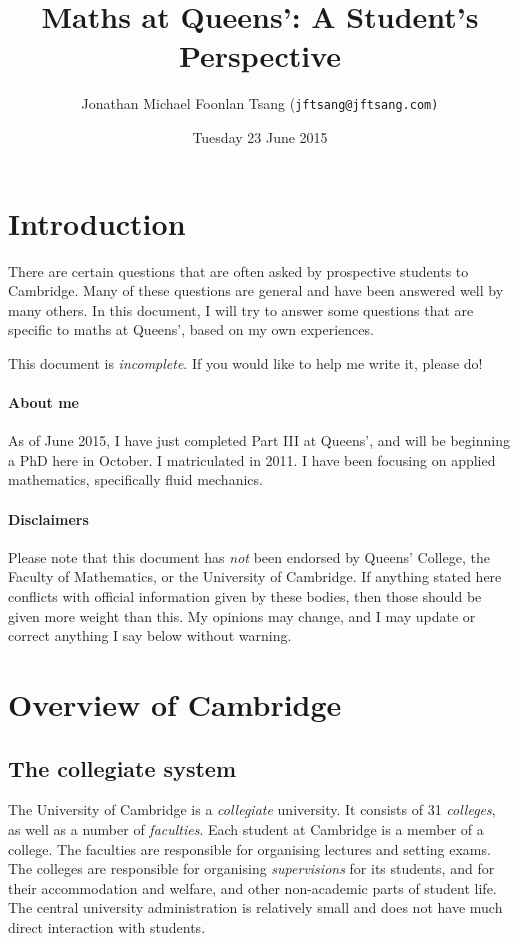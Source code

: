 \documentclass[a4paper]{article}
\title{Maths at Queens': A Student's Perspective}
\author{Jonathan Michael Foonlan Tsang (\tt{jftsang@jftsang.com})}
\date{Tuesday 23 June 2015}
\begin{document}
\maketitle

\tableofcontents

\section{Introduction}

There are certain questions that are often asked by prospective students to
Cambridge. Many of these questions are general and have been answered well by
many others. In this document, I will try to answer some questions that are
specific to maths at Queens', based on my own experiences. 

This document is \textit{incomplete}. If you would like to help me write it,
please do! 
 
\paragraph{About me} As of June 2015, I have just completed Part III at Queens',
and will be beginning a PhD here in October. I matriculated in 2011. I have been
focusing on applied mathematics, specifically fluid mechanics. 

\paragraph{Disclaimers} Please note that this document has \textit{not} been
endorsed by Queens' College, the Faculty of Mathematics, or the University of
Cambridge. If anything stated here conflicts with official information given by
these bodies, then those should be given more weight than this. My opinions may
change, and I may update or correct anything I say below without warning. 

\section{Overview of Cambridge}

\subsection{The collegiate system}

The University of Cambridge is a \textit{collegiate} university. It consists of
31 \textit{colleges}, as well as a number of \textit{faculties}. Each student at
Cambridge is a member of a college. The faculties are responsible for organising
lectures and setting exams. The colleges are responsible for organising
\textit{supervisions} for its students, and for their accommodation and welfare,
and other non-academic parts of student life. The central university
administration is relatively small and does not have much direct interaction
with students.
\end{document}
